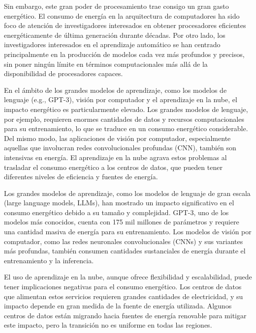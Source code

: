 Sin embargo, este gran poder de procesamiento trae consigo un gran gasto energético.
El consumo de energía en la arquitectura de computadores ha sido foco de atención de investigadores interesados en obtener procesadores eficientes energéticamente de última generación durante décadas. 
Por otro lado, los investigadores interesados en el aprendizaje automático se han centrado principalmente en la producción de modelos cada vez más profundos y precisos, sin poner ningún límite en términos computacionales más allá de la disponibilidad de procesadores capaces.


En el ámbito de los grandes modelos de aprendizaje, como los modelos de lenguaje (e.g., GPT-3), visión por computador y el aprendizaje en la nube, el impacto energético es particularmente elevado. Los grandes modelos de lenguaje, por ejemplo, requieren enormes cantidades de datos y recursos computacionales para su entrenamiento, lo que se traduce en un consumo energético considerable. Del mismo modo, las aplicaciones de visión por computador, especialmente aquellas que involucran redes convolucionales profundas (CNN), también son intensivas en energía. El aprendizaje en la nube agrava estos problemas al trasladar el consumo energético a los centros de datos, que pueden tener diferentes niveles de eficiencia y fuentes de energía.

Los grandes modelos de aprendizaje, como los modelos de lenguaje de gran escala (large language models, LLMs), han mostrado un impacto significativo en el consumo energético debido a su tamaño y complejidad. GPT-3, uno de los modelos más conocidos, cuenta con 175 mil millones de parámetros y requiere una cantidad masiva de energía para su entrenamiento. Los modelos de visión por computador, como las redes neuronales convolucionales (CNNs) y sus variantes más profundas, también consumen cantidades sustanciales de energía durante el entrenamiento y la inferencia.

El uso de aprendizaje en la nube, aunque ofrece flexibilidad y escalabilidad, puede tener implicaciones negativas para el consumo energético. Los centros de datos que alimentan estos servicios requieren grandes cantidades de electricidad, y su impacto depende en gran medida de la fuente de energía utilizada. Algunos centros de datos están migrando hacia fuentes de energía renovable para mitigar este impacto, pero la transición no es uniforme en todas las regiones.


